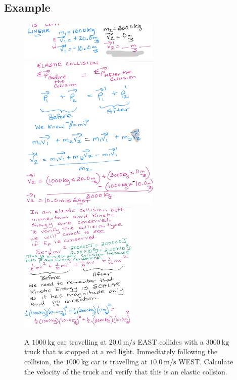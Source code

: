 \documentclass[a4paper,12pt]{article}
\begin{document}
\subsection{Example}
\begin{figure}[H]
    \caption{A $\SI{1000}{\kg}$ car travelling at $\SI{20.0}{\m/\s}$ EAST collides with a $\SI{3000}{\kg}$ truck that is stopped at a red light. Immediately following the collision, the $\SI{1000}{\kg}$ car is travelling at $\SI{10.0}{\m/\s}$ WEST. Calculate the velocity of the truck and verify that this is an elastic collsion.}
    \includegraphics[width=0.6\textwidth]{q-elastic-1a}
    \includegraphics[width=0.6\textwidth]{q-elastic-1b}
    \includegraphics[width=0.5\textwidth]{q-elastic-1c}
    \centering
\end{figure}
\end{document}

